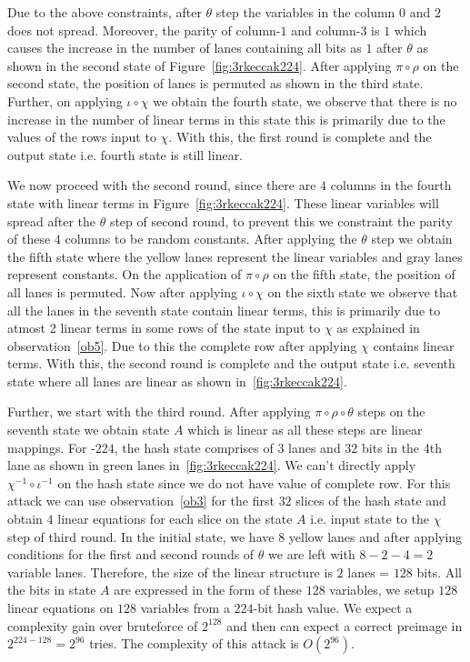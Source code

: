 Due to the above constraints, after $\theta$ step the variables in the column $0$ and $2$ does not spread. Moreover, the parity of column-$1$ and column-$3$ is $1$ which causes the increase in the number of lanes containing all bits as $1$ after $\theta$ as shown in the second state of Figure~\ref{fig:3rkeccak224}. After applying $\pi \circ \rho$ on the second state, the position of lanes is permuted as shown in the third state. Further, on applying $\iota \circ \chi$ we obtain the fourth state, we observe that there is no increase in the number of linear terms in this state this is primarily due to the values of the rows input to $\chi$. With this, the first round is complete and the output state i.e. fourth state is still linear.

We now proceed with the second round, since there are $4$ columns in the fourth state with linear terms in Figure~\ref{fig:3rkeccak224}. These linear variables will spread after the $\theta$ step of second round, to prevent this we constraint the parity of these $4$ columns to be random constants. After applying the $\theta$ step we obtain the fifth state where the yellow lanes represent the linear variables and gray lanes represent constants. On the application of $\pi \circ \rho$ on the fifth state, the position of all lanes is permuted. Now after applying $\iota \circ \chi$ on the sixth state we observe that all the lanes in the seventh state contain linear terms, this is primarily due to atmost 2 linear terms in some rows of the state input to $\chi$ as explained in observation~\ref{ob5}. Due to this the complete row after applying $\chi$ contains linear terms. With this, the second round is complete and the output state i.e. seventh state where all lanes are linear as shown in~\ref{fig:3rkeccak224}.

Further, we start with the third round. After applying $\pi \circ \rho \circ \theta$ steps on the seventh state we obtain state $A$ which is linear as all these steps are linear mappings. For \Keccak{}-$224$, the hash state comprises of $3$ lanes and $32$ bits in the 4th lane as shown in green lanes in~\ref{fig:3rkeccak224}. We can't directly apply $\chi^{-1} \circ \iota^{-1}$ on the hash state since we do not have value of complete row. For this attack we can use observation~\ref{ob3} for the first $32$ slices of the hash state and obtain $4$ linear equations for each slice on the state $A$ i.e. input state to the $\chi$ step of third round. In the initial state, we have $8$ yellow lanes and after applying conditions for the first and second rounds of $\theta$ we are left with $8 - 2 - 4 = 2$ variable lanes. Therefore, the size of the linear structure is $2$ lanes = $128$ bits. All the bits in state $A$ are expressed in the form of these $128$ variables, we setup $128$ linear equations on $128$ variables from a $224$-bit hash value. We expect a complexity gain over bruteforce of $2^{128}$ and then can expect a correct preimage in $2^{224 - 128} = 2^{96}$ tries. The complexity of this attack is $O(2^{96})$.


